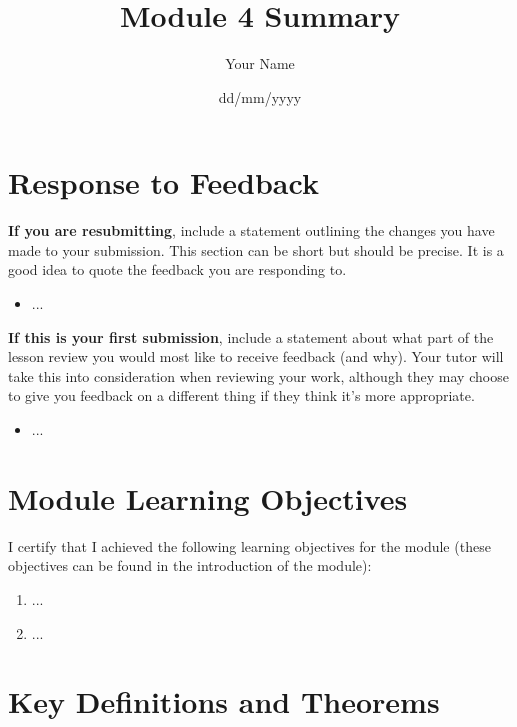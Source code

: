 \documentclass[
  12pt,
  a4paper,
]{article}
\title{Module 4 Summary}
\author{Your Name}
\date{dd/mm/yyyy}
\begin{document}
\maketitle



\section*{Response to Feedback} 

\textbf{If you are resubmitting}, include a statement outlining the changes you have made to your submission. This section can be short but should be precise. It is a good idea to quote the feedback you are responding to.
\begin{itemize}
    \item ... %
\end{itemize}

\noindent
\textbf{If this is your first submission}, include a statement about what part of the lesson review you would most like to receive feedback (and why). Your tutor will take this into consideration when reviewing your work, although they may choose to give you feedback on a different thing if they think it’s more appropriate. 
\begin{itemize}
    \item ... %
\end{itemize}

\section*{Module Learning Objectives}
I certify that I achieved the following learning objectives for the module (these objectives can be found in the introduction of the module):
\begin{enumerate}
    \item ...
    \item ...
\end{enumerate}

\vspace{2cm}

\section*{Key Definitions and Theorems}

\end{document}

